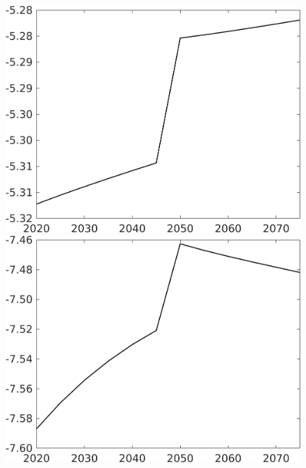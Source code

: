 \documentclass[12pt]{article}
\begin{document}
\begin{figure}[h!!]
\begin{minipage}[]{0.32\textwidth}
\end{minipage}	
\begin{minipage}[]{0.32\textwidth}
\includegraphics[width=1\textwidth]{../../codding_model/own_basedOnFried/optimalPol_010922_revision/figures/all_13Sept22/CompTaufPER_bytaul_Reg0_hl_spillover0_nsk0_xgr0_knspil0_sep0_LFlimit1_emsbase0_countec0_GovRev0_etaa0.79_lgd0.png}
\end{minipage}	
\begin{minipage}[]{0.32\textwidth}
\includegraphics[width=1\textwidth]{../../codding_model/own_basedOnFried/optimalPol_010922_revision/figures/all_13Sept22/CompTaufPER_bytaul_Reg0_C_spillover0_nsk0_xgr0_knspil0_sep0_LFlimit1_emsbase0_countec0_GovRev0_etaa0.79_lgd0.png}

\end{minipage}
\end{figure}
\end{document}

